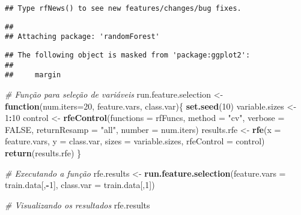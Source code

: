 \documentclass[
]{article}
\newenvironment{Shaded}{\begin{snugshade}}{\end{snugshade}}
\newcommand{\CommentTok}[1]{\textcolor[rgb]{0.56,0.35,0.01}{\textit{#1}}}
\newcommand{\ControlFlowTok}[1]{\textcolor[rgb]{0.13,0.29,0.53}{\textbf{#1}}}
\newcommand{\DataTypeTok}[1]{\textcolor[rgb]{0.13,0.29,0.53}{#1}}
\newcommand{\DecValTok}[1]{\textcolor[rgb]{0.00,0.00,0.81}{#1}}
\newcommand{\KeywordTok}[1]{\textcolor[rgb]{0.13,0.29,0.53}{\textbf{#1}}}
\newcommand{\NormalTok}[1]{#1}
\newcommand{\OperatorTok}[1]{\textcolor[rgb]{0.81,0.36,0.00}{\textbf{#1}}}
\newcommand{\OtherTok}[1]{\textcolor[rgb]{0.56,0.35,0.01}{#1}}
\newcommand{\StringTok}[1]{\textcolor[rgb]{0.31,0.60,0.02}{#1}}
\begin{document}
\begin{verbatim}
## Type rfNews() to see new features/changes/bug fixes.
\end{verbatim}

\begin{verbatim}
## 
## Attaching package: 'randomForest'
\end{verbatim}

\begin{verbatim}
## The following object is masked from 'package:ggplot2':
## 
##     margin
\end{verbatim}

\begin{Shaded}
\begin{Highlighting}[]
\CommentTok{# Função para seleção de variáveis}
\NormalTok{run.feature.selection <-}\StringTok{ }\ControlFlowTok{function}\NormalTok{(}\DataTypeTok{num.iters=}\DecValTok{20}\NormalTok{, feature.vars, class.var)\{}
  \KeywordTok{set.seed}\NormalTok{(}\DecValTok{10}\NormalTok{)}
\NormalTok{  variable.sizes <-}\StringTok{ }\DecValTok{1}\OperatorTok{:}\DecValTok{10}
\NormalTok{  control <-}\StringTok{ }\KeywordTok{rfeControl}\NormalTok{(}\DataTypeTok{functions =}\NormalTok{ rfFuncs, }\DataTypeTok{method =} \StringTok{"cv"}\NormalTok{, }
                        \DataTypeTok{verbose =} \OtherTok{FALSE}\NormalTok{, }\DataTypeTok{returnResamp =} \StringTok{"all"}\NormalTok{, }
                        \DataTypeTok{number =}\NormalTok{ num.iters)}
\NormalTok{  results.rfe <-}\StringTok{ }\KeywordTok{rfe}\NormalTok{(}\DataTypeTok{x =}\NormalTok{ feature.vars, }\DataTypeTok{y =}\NormalTok{ class.var, }
                     \DataTypeTok{sizes =}\NormalTok{ variable.sizes, }
                     \DataTypeTok{rfeControl =}\NormalTok{ control)}
  \KeywordTok{return}\NormalTok{(results.rfe)}
\NormalTok{\}}

\CommentTok{# Executando a função}
\NormalTok{rfe.results <-}\StringTok{ }\KeywordTok{run.feature.selection}\NormalTok{(}\DataTypeTok{feature.vars =}\NormalTok{ train.data[,}\OperatorTok{-}\DecValTok{1}\NormalTok{], }
                                     \DataTypeTok{class.var =}\NormalTok{ train.data[,}\DecValTok{1}\NormalTok{])}


\CommentTok{# Visualizando os resultados}
\NormalTok{rfe.results}
\end{Highlighting}
\end{Shaded}
\end{document}

